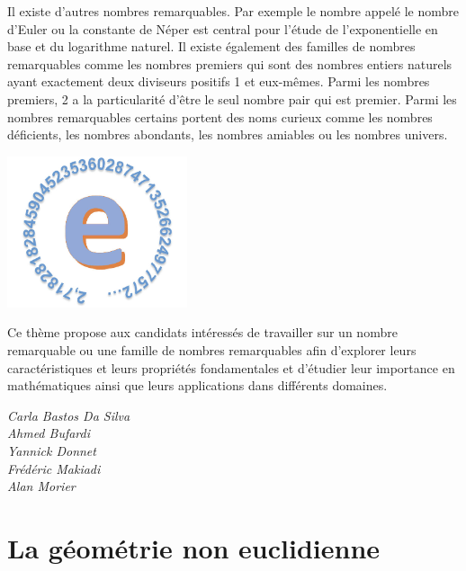 \documentclass[
  10pt,
  french,
  a5paper,
  openany]{book}
\newenvironment{signature}{\begin{flushright}}{\end{flushright}}
\begin{document}
Il existe d'autres nombres remarquables. Par exemple le nombre appelé le nombre d'Euler ou la constante de Néper est central pour l'étude de l'exponentielle en base et du logarithme naturel. Il existe également des familles de nombres remarquables comme les nombres premiers qui sont des nombres entiers naturels ayant exactement deux diviseurs positifs 1 et eux-mêmes. Parmi les nombres premiers, 2 a la particularité d'être le seul nombre pair qui est premier. Parmi les nombres remarquables certains portent des noms curieux comme les nombres déficients, les nombres abondants, les nombres amiables ou les nombres univers.

\begin{center}
\includegraphics[width=\textwidth,height=12em]{images/les-nombres-remarquables-2.jpg}

\end{center}

Ce thème propose aux candidats intéressés de travailler sur un nombre remarquable ou une famille de nombres remarquables afin d'explorer leurs caractéristiques et leurs propriétés fondamentales et d'étudier leur importance en mathématiques ainsi que leurs applications dans différents domaines.

\begin{signature}
\emph{Carla Bastos Da Silva}\\
\emph{Ahmed Bufardi}\\
\emph{Yannick Donnet}\\
\emph{Frédéric Makiadi}\\
\emph{Alan Morier}

\end{signature}

\hypertarget{la-guxe9omuxe9trie-non-euclidienne}{%
\chapter{La géométrie non euclidienne}\label{la-guxe9omuxe9trie-non-euclidienne}}

\end{document}

